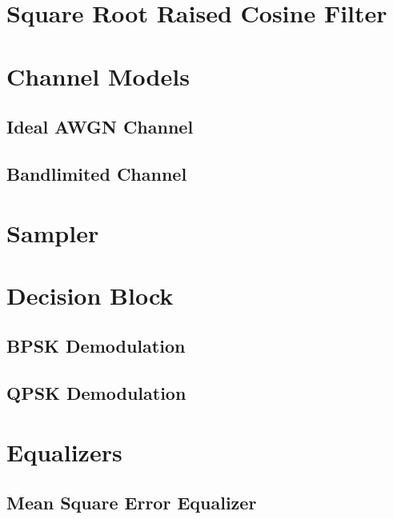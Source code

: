 \documentclass[]{article}
\begin{document}
\section{Square Root Raised Cosine Filter}
\label{app:sqrt_raised_cosine}


\section{Channel Models}
\subsection{Ideal AWGN Channel}
\label{app:awgn_channel}


\subsection{Bandlimited Channel}
\label{app:bandlimited}


\section{Sampler}
\label{app:sampler}


\section{Decision Block}
\label{app:dblocks}
\subsection{BPSK Demodulation}
\label{app:bpsk_demod}


\subsection{QPSK Demodulation}
\label{app:qpsk_demod}


\section{Equalizers}
\label{app:equal}
\subsection{Mean Square Error Equalizer}
\label{app:mse}

\end{document}
